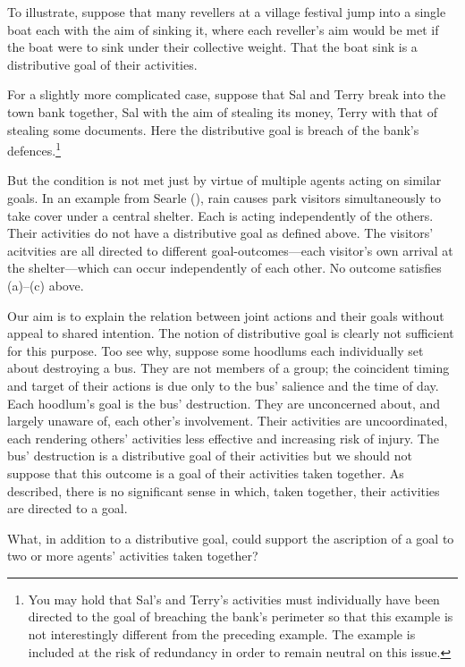 \documentclass[12pt,a4paper]{extarticle}
\begin{document}
To illustrate, suppose that many revellers at a village festival jump into a single boat each with the aim of sinking it, where each reveller's aim would be met if the boat were to sink under their collective weight.  
That the boat sink is a distributive goal of their activities.

For a slightly more complicated case, suppose that Sal and Terry break into the town bank together, Sal with the aim of stealing its money, Terry with that of stealing some documents.  Here the distributive goal is breach of the bank's defences.\footnote
{
You may hold that Sal's and Terry's activities must individually have been directed to the goal of breaching the bank's perimeter so that this example is not interestingly different from the preceding example.  
The example is included at the risk of redundancy in order to remain neutral on this issue.
}  



But the condition is not met just by virtue of multiple agents acting on similar goals.  In an example from Searle (\citeyear[p.\ 92]{Searle:1990em}), rain causes park visitors simultaneously to take cover under a central shelter.  Each is acting independently of the others.  Their activities do not have a distributive goal as defined above.  The visitors' acitvities are all directed to different goal-outcomes---each visitor's own arrival at the shelter---which can occur independently of each other.  No outcome satisfies (a)--(c) above.


Our aim is to explain the relation between joint actions and their goals without appeal to shared intention.  The notion of distributive goal is clearly not sufficient for this purpose.  Too see why, suppose some hoodlums each individually set about destroying a bus.  They are not members of a group; the coincident timing and target of their actions is due only to the bus' salience and the time of day.  Each hoodlum's goal is the bus' destruction.  They are unconcerned about, and largely unaware of, each other's involvement.  Their activities are uncoordinated, each rendering others' activities less effective and increasing risk of injury.  The bus' destruction is a distributive goal of their activities but we should not suppose that this outcome is a goal of their activities taken together.  As described, there is no significant sense in which, taken together, their activities are directed to a goal.

What, in addition to a distributive goal, could support the ascription of a goal to two or more agents' activities taken together?
\end{document}
